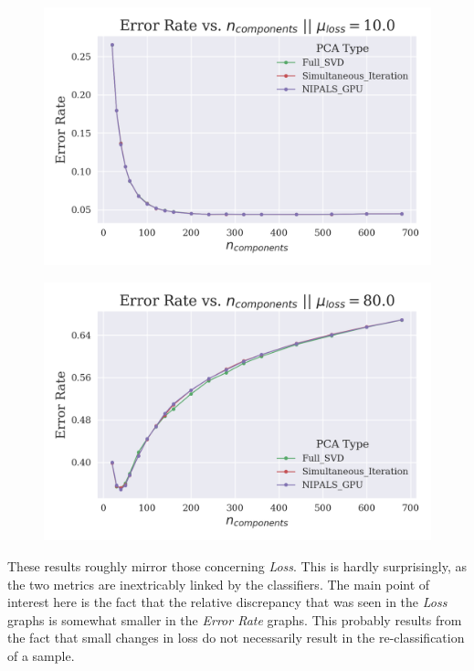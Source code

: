 \documentclass[12pt]{article}
\begin{document}
\begin{figure}[H]
\centering
\begin{minipage}{.45\textwidth}
  \centering
  \includegraphics[width=\linewidth]{Noise10Error.png}
  \label{Noise10Error}
\end{minipage}%
\quad
\begin{minipage}{.45\textwidth}
  \centering
  \includegraphics[width=\linewidth]{Noise80Error.png}
  \label{Noise80Error}
\end{minipage}
\end{figure}

These results roughly mirror those concerning \textit{Loss}. This is hardly surprisingly, as the two metrics are inextricably linked by the classifiers. The main point of interest here is the fact that the relative discrepancy that was seen in the \textit{Loss} graphs is somewhat smaller in the \textit{Error Rate} graphs. This probably results from the fact that small changes in loss do not necessarily result in the re-classification of a sample.
\end{document}
